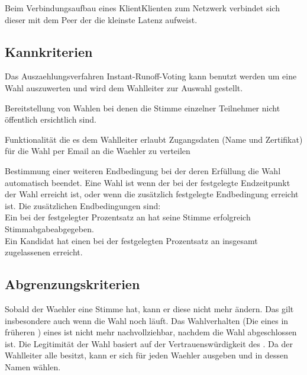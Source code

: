 \documentclass[parskip=full,11pt,twoside]{scrartcl}
\begin{document}
Beim Verbindungsaufbau eines \gls{Klient}{Klienten} zum \gls{Netzwerk} verbindet sich dieser mit dem \gls{Peer} der die kleinste \gls{Latenz} aufweist.

\subsection{Kannkriterien}

Das \gls{Auszaehlungsverfahren} \gls{Instant-Runoff-Voting} kann benutzt werden um eine Wahl auszuwerten und wird dem \gls{Wahlleiter} zur Auswahl gestellt.

Bereitstellung von Wahlen bei denen die Stimme einzelner Teilnehmer nicht öffentlich ersichtlich sind.

Funktionalität die es dem \gls{Wahlleiter} erlaubt Zugangsdaten (Name und \gls{Zertifikat}) für die \gls{Wahl} per Email an die \gls{Waehler} zu verteilen

Bestimmung einer weiteren Endbedingung bei der  deren Erfüllung die \gls{Wahl} automatisch beendet.
Eine Wahl ist  wenn der bei der  festgelegte Endzeitpunkt der Wahl erreicht ist, oder wenn die zusätzlich festgelegte Endbedingung erreicht ist.
Die zusätzlichen Endbedingungen sind:\\
Ein bei der  festgelegter Prozentsatz an  hat seine Stimme erfolgreich \gls{Stimmabgabe}{abgegeben}.\\
Ein \gls{Kandidat} hat einen bei der  festgelegten Prozentsatz an insgesamt zugelassenen  erreicht.

\subsection{Abgrenzungskriterien}
Sobald der \gls{Waehler} eine Stimme  hat, kann er diese nicht mehr ändern. Das gilt insbesondere auch wenn die \gls{Wahl} noch läuft.
Das Wahlverhalten (Die  eines  in früheren ) eines  ist nicht mehr nachvollziehbar, nachdem die \gls{Wahl} abgeschlossen ist.
Die Legitimität der \gls{Wahl} basiert auf der Vertrauenswürdigkeit des . Da der \gls{Wahlleiter} alle  besitzt, kann er sich für jeden \gls{Waehler} ausgeben und in dessen Namen wählen.
\end{document}
